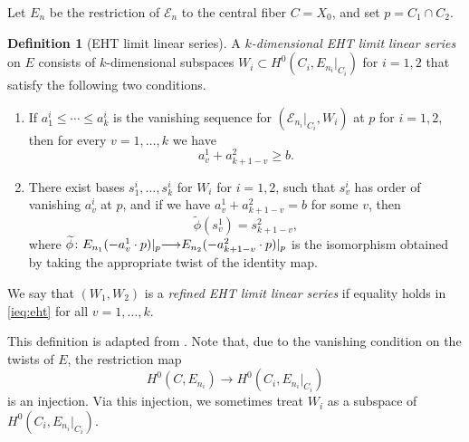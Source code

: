 \documentclass[11pt,reqno]{amsart}
\theoremstyle{plain}
\theoremstyle{definition}
\newtheorem{definition}[theorem]{Definition}
\theoremstyle{remark}
\numberwithin{equation}{section}
\renewcommand{\to}{{\longrightarrow}}
\numberwithin{equation}{section}
\begin{document}
Let $E_n$ be the restriction of $\mathcal E_n$ to the central fiber $C = X_0$, and set $p = C_1 \cap C_2$.
\begin{definition}[EHT limit linear series]
  \label{def:eht}
  A \emph{$k$-dimensional EHT limit linear series} on $E$ consists of $k$-dimensional subspaces $W_i \subset H^0(C_i, E_{n_i}|_{C_i})$ for $i = 1, 2$ that satisfy the following two conditions.
  \begin{enumerate}
  \item
    \label{ieq:eht}
    If $a^i_1 \leq \cdots \leq a^i_k$ is the vanishing sequence for $(\mathcal E_{n_i}|_{C_i}, W_i)$ at $p$ for $i = 1, 2$, then for every $v = 1, \dots, k$ we have
    \[ a^1_v + a^2_{k+1-v} \geq b.\]
  \item\label{gluing:eht}
    There exist bases $s^i_1, \dots, s^i_k$ for $W_i$ for $i = 1, 2$, such that $s^i_v$ has order of vanishing $a^i_v$ at $p$, and if we have $a^1_v + a^2_{k+1-v} = b$ for some $v$, then
    \[ \widetilde \phi (s^1_v) = s^2_{k+1-v},\]
    where $\widetilde \phi \from E_{n_1}(-a^1_{v}\cdot p)|_p \to E_{n_2}(-a^2_{k+1-v} \cdot p) |_p$ is the isomorphism obtained by taking the appropriate twist of the identity map.
  \end{enumerate}
  We say that $(W_1, W_2)$ is a \emph{refined EHT limit linear series} if equality holds in \eqref{ieq:eht} for all $v = 1, \dots, k$.
\end{definition}
This definition is adapted from \cite[Definition~4.1.2]{oss:14}.
Note that, due to the vanishing condition on the twists of $E$, the restriction map
\[ H^0(C, E_{n_i}) \to H^0(C_i, E_{n_i}|_{C_i})\]
is an injection.
Via this injection, we sometimes treat $W_i$ as a subspace of $H^0(C_i, E_{n_i}|_{C_i})$.
\end{document}
